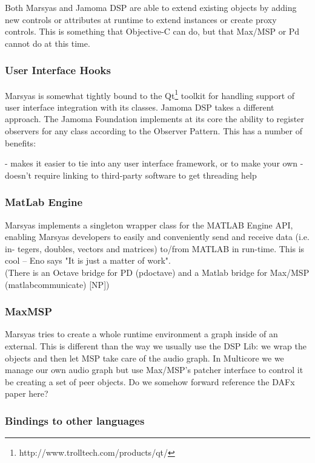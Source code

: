 \documentclass[twoside,10pt]{article}
\begin{document}
Both Marsyas and Jamoma DSP are able to extend existing objects by adding new controls or attributes at runtime to extend instances or create proxy controls.  This is something that Objective-C can do, but that Max/MSP or Pd cannot do at this time.

\subsubsection{User Interface Hooks}

Marsyas is somewhat tightly bound to the Qt\footnote{http://www.trolltech.com/products/qt/} toolkit for handling support of user interface integration with its classes.  Jamoma DSP takes a different approach.  The Jamoma Foundation implements at its core the ability to register observers for any class according to the Observer Pattern\cite{Gamma:1995}.  This has a number of benefits:

- makes it easier to tie into any user interface framework, or to make your own
- doesn't require linking to third-party software to get threading help

\subsubsection{MatLab Engine}

Marsyas implements a singleton wrapper class for the MATLAB Engine API, enabling Marsyas developers to easily and conveniently send and receive data (i.e. in- tegers, doubles, vectors and matrices) to/from MATLAB in run-time.  This is cool -- Eno says "It is just a matter of work".   \\
(There is an Octave bridge for PD (pdoctave) and a Matlab bridge for Max/MSP (matlabcommunicate) [NP])

\subsubsection{MaxMSP}

Marsyas tries to create a whole runtime environment a graph inside of an external.  This is different than the way we usually use the DSP Lib: we wrap the objects and then let MSP take care of the audio graph.  In Multicore we we manage our own audio graph but use Max/MSP's patcher interface to control it be creating a set of peer objects.  Do we somehow forward reference the DAFx paper here?

\subsubsection{Bindings to other languages}
\end{document}
